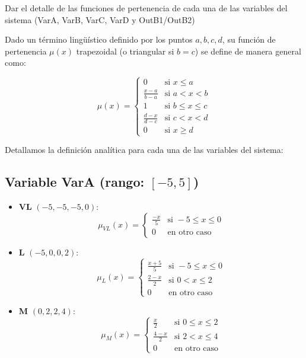 \documentclass[11pt, a4paper]{article}
\newenvironment{problem}[1][Cuestión]{
	\vspace{0.5cm}
	\noindent{\Large\bfseries #1} \par\vspace{0.5cm}
}{
	\vspace{0.5cm}
}
\begin{document}
	\begin{problem}[Problema 1 (20 \%)]
		Dar el detalle de las funciones de pertenencia de cada una de las variables del sistema (VarA, VarB, VarC, VarD y OutB1/OutB2)

		{ \color{blue} 
			Dado un término lingüístico definido por los puntos $a, b, c, d$, su función de pertenencia $\mu(x)$ trapezoidal (o triangular si $b=c$) se define de manera general como:

			\[
			\mu(x) = \begin{cases} 
			0 & \text{si } x \le a \\
			\frac{x-a}{b-a} & \text{si } a < x < b \\
			1 & \text{si } b \le x \le c \\
			\frac{d-x}{d-c} & \text{si } c < x < d \\
			0 & \text{si } x \ge d 
			\end{cases}
			\]

			Detallamos la definición analítica para cada una de las variables del sistema:

			\subsection*{Variable VarA (rango: $[-5, 5]$)}
				\begin{itemize}
					\item \textbf{VL} $(-5, -5, -5, 0)$:
						\[
						\mu_{VL}(x) = \begin{cases} 
						\frac{-x}{5} & \text{si } -5 \le x \le 0 \\ 
						0 & \text{en otro caso} 
						\end{cases}
						\]

					\item \textbf{L} $(-5, 0, 0, 2)$:
						\[
						\mu_{L}(x) = \begin{cases} 
						\frac{x+5}{5} & \text{si } -5 \le x \le 0 \\ 
						\frac{2-x}{2} & \text{si } 0 < x \le 2 \\ 
						0 & \text{en otro caso} 
						\end{cases}
						\]

					\item \textbf{M} $(0, 2, 2, 4)$:
						\[
						\mu_{M}(x) = \begin{cases} 
						\frac{x}{2} & \text{si } 0 \le x \le 2 \\ 
						\frac{4-x}{2} & \text{si } 2 < x \le 4 \\ 
						0 & \text{en otro caso} 
						\end{cases}
						\]


\end{itemize}}
\end{problem}
\end{document}

